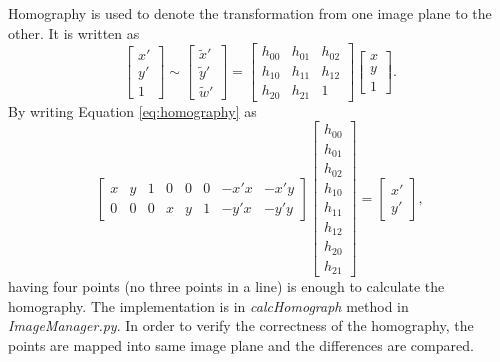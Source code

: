 \documentclass[paper=a4, fontsize=11pt]{scrartcl}
\begin{document}
Homography is used to denote the transformation from one image plane to the other.
It is written as 
\begin{equation}
\label{eq:homography}
\begin{bmatrix}
x' \\
y' \\
1
\end{bmatrix}
\sim
\begin{bmatrix}
\tilde{x}' \\
\tilde{y}' \\
\tilde{w}'
\end{bmatrix}
=
\begin{bmatrix}
h_{00} & h_{01} & h_{02} \\
h_{10} & h_{11} & h_{12} \\
h_{20} & h_{21} & 1 
\end{bmatrix}
\begin{bmatrix}
x \\
y \\
1
\end{bmatrix}.
\end{equation}
By writing Equation \ref{eq:homography} as
\begin{equation}
\label{eq:homography_linear_form}
\begin{bmatrix}
x & y & 1 & 0 & 0 & 0 & -x'x & -x'y \\
0 & 0 & 0 & x & y & 1 & -y'x & -y'y
\end{bmatrix}
\begin{bmatrix}
h_{00} \\
h_{01} \\
h_{02} \\
h_{10} \\
h_{11} \\
h_{12} \\
h_{20} \\
h_{21} 
\end{bmatrix}
=
\begin{bmatrix}
x' \\ y'
\end{bmatrix},
\end{equation}
having four points (no three points in a line) is enough to calculate the homography. 
The implementation is in \emph{calcHomograph} method in \emph{ImageManager.py}.
In order to verify the correctness of the homography, the points are mapped into same image plane and the differences are compared.
\end{document}

